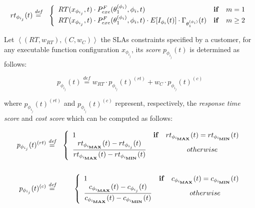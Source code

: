 \documentclass[12pt,a4paper]{report}
\newcommand{\mathDef}{\overset{\textit{def}}{=}}
\begin{document}
\begin{eqnarray}
	rt_{\phi_{i_{j}}}(t) & \mathDef & \left\{ 
	\begin{array}{lcl}
	RT(x_{\phi_{i_{j}}},t) \cdot P_{exe}^{F}(\theta^{(\phi_i)}_1, \phi_i,t) & \text{\textbf{if}} & m = 1 \nonumber \\ 
	RT(x_{\phi_{i_{j}}},t) \cdot P_{exe}^{F}(\theta^{(\phi_i)}_1, \phi_i,t) \cdot E[I_{\phi_i}(t)] \cdot \Gamma_{\theta_1^{(\phi_{i})}}(t) & \text{\textbf{if}} & m \geq 2 \\ 
\end{array} \right.\label{responseTime}\\
\end{eqnarray}

Let $\left\langle (RT,w_{RT}),(C,w_{C}) \right\rangle$ the SLAs constraints specified by a customer, for any executable function configuration $x_{\phi_{i_j}}$, its \textit{score} $p_{\phi_{i_{j}}}(t)$ is determined as follows:

\begin{equation}\label{profit}
	p_{\phi_{i_{j}}}(t) \mathDef w_{RT} \cdot p_{\phi_{i_{j}}}(t)^{(rt)} + w_{C} \cdot p_{\phi_{i_{j}}}(t)^{(c)}
\end{equation}

where $p_{\phi_{i_{j}}}(t)^{(rt)}$ and $p_{\phi_{i_{j}}}(t)^{(c)}$ represent, respectively, the \textit{response time score} and \textit{cost score} which can be computed as follows:

\begin{eqnarray}
	p_{\phi_{i_{j}}}(t)^{(rt)} & \mathDef & \left\{ 
	\begin{array}{lcc}
		1 & \text{\textbf{if}} & rt_{\phi_{i_{\textbf{MAX}}}}(t) = rt_{\phi_{i_{\textbf{MIN}}}}(t) \\ 
		\dfrac{rt_{\phi_{i_{\textbf{MAX}}}}(t) - rt_{\phi_{i_{j}}}(t)}{rt_{\phi_{i_{\textbf{MAX}}}}(t) - rt_{\phi_{i_{\textbf{MIN}}}}(t)} & & otherwise \\ 
	\end{array} \right.\\\nonumber\\
	p_{\phi_{i_{j}}}(t)^{(c)} & \mathDef & \left\{ 
	\begin{array}{lcc}
		1 & \text{\textbf{if}} & c_{\phi_{i_{\textbf{MAX}}}}(t) = c_{\phi_{i_{\textbf{MIN}}}}(t) \\ 
		\dfrac{c_{\phi_{i_{\textbf{MAX}}}}(t) - c_{\phi_{i_{j}}}(t)}{c_{\phi_{i_{\textbf{MAX}}}}(t) - c_{\phi_{i_{\textbf{MIN}}}}(t)} &&otherwise \\ 
	\end{array} \right.
\end{eqnarray}
\end{document}
